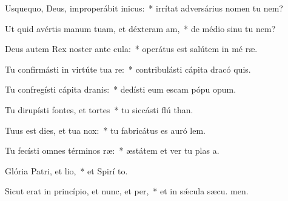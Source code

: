 \item Usquequo, Deus, improperábit inicus:~* irrítat adversárius nomen tu  nem?
\item Ut quid avértis manum tuam, et déxteram am,~* de médio sinu tu  nem?
\item Deus autem Rex noster ante cula:~* operátus est salútem in mé ræ.
\item Tu confirmásti in virtúte tua re:~* contribulásti cápita dracó  quis.
\item Tu confregísti cápita dranis:~* dedísti eum escam pópu opum.
\item Tu dirupísti fontes, et tortes~* tu siccásti flú than.
\item Tuus est dies, et tua  nox:~* tu fabricátus es auró  lem.
\item Tu fecísti omnes términos ræ:~* æstátem et ver tu plas a.
\item Glória Patri, et lio,~* et Spirí to.
\item Sicut erat in princípio, et nunc, et per,~* et in sǽcula sæcu. men.
